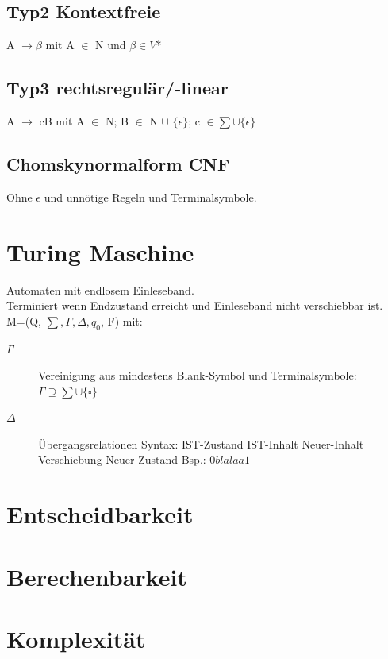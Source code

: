 \documentclass[12pt,a4paper]{article}
\begin{document}
    \subsection{Typ2 Kontextfreie}
      A $\rightarrow \beta$ mit A $\in$ N und $\beta \in V$*
    \subsection{Typ3 rechtsregulär/-linear}
      A $\rightarrow$ cB mit A $\in$ N; B $\in$ N $\cup$ $\{ \epsilon \}$; c $\in \sum \cup \{ \epsilon \}$
    \subsection{Chomskynormalform CNF}
      Ohne $\epsilon$ und unnötige Regeln und Terminalsymbole.\\

\section{Turing Maschine}
	Automaten mit endlosem Einleseband.\\
	Terminiert wenn Endzustand erreicht und Einleseband nicht verschiebbar ist.\\
	M=(Q, $\sum, \Gamma , \Delta , q_0$, F) mit:\\
	\begin{description}
		\item[$\Gamma$] Vereinigung aus mindestens Blank-Symbol und Terminalsymbole: $\Gamma \supseteq \sum \cup \{ \square \} $
		\item[$\Delta$] Übergangsrelationen Syntax: IST-Zustand IST-Inhalt Neuer-Inhalt Verschiebung Neuer-Zustand Bsp.: $0 blalaa1$
	\end{description}

\section{Entscheidbarkeit}

\section{Berechenbarkeit}

\section{Komplexität}
\end{document}
